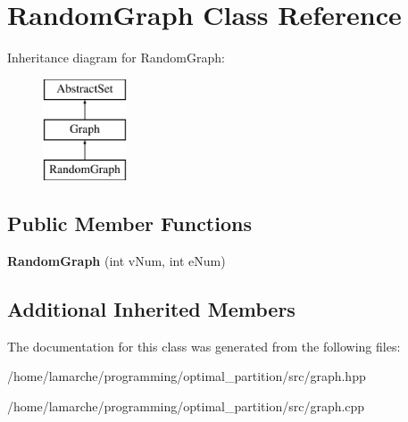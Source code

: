 \hypertarget{classRandomGraph}{\section{Random\-Graph Class Reference}
\label{classRandomGraph}
}
Inheritance diagram for Random\-Graph\-:\begin{figure}[H]
\begin{center}
\leavevmode
\includegraphics[height=3.000000cm]{classRandomGraph}
\end{center}
\end{figure}
\subsection*{Public Member Functions}
\begin{DoxyCompactItemize}
\item 
\hypertarget{classRandomGraph_aff05f804f75600257bf90455729b330f}{{\bfseries Random\-Graph} (int v\-Num, int e\-Num)}\label{classRandomGraph_aff05f804f75600257bf90455729b330f}

\end{DoxyCompactItemize}
\subsection*{Additional Inherited Members}


The documentation for this class was generated from the following files\-:\begin{DoxyCompactItemize}
\item 
/home/lamarche/programming/optimal\-\_\-partition/src/graph.\-hpp\item 
/home/lamarche/programming/optimal\-\_\-partition/src/graph.\-cpp\end{DoxyCompactItemize}
